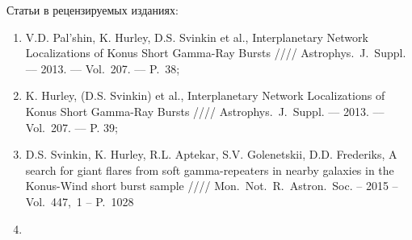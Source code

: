 Статьи в рецензируемых изданиях:
\begin{enumerate}
\item V.D. Pal'shin, K. Hurley, D.S. Svinkin et al., Interplanetary Network Localizations of
Konus Short Gamma-Ray Bursts //// Astrophys.~J.~Suppl. –– 2013. –– Vol.~207. –– P.~38;
\item K. Hurley, (D.S. Svinkin) et al., Interplanetary Network Localizations of
Konus Short Gamma-Ray Bursts //// Astrophys.~J.~Suppl. –– 2013. –– Vol.~207. –– P. 39;
\item D.S. Svinkin, K. Hurley, R.L. Aptekar, S.V. Golenetskii, D.D. Frederiks, 
A search for giant flares from soft gamma-repeaters in nearby galaxies in the 
Konus-Wind short burst sample //// Mon.~Not.~R.~Astron.~Soc. -- 2015 -- Vol.~447,~1 -- P.~1028
\item 
\end{enumerate}

